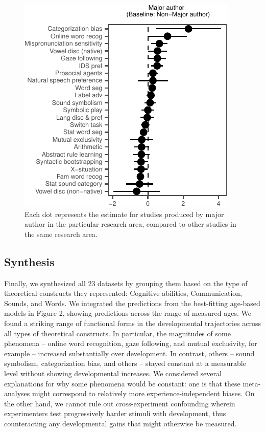 \documentclass[10pt, letterpaper]{article}
\newenvironment{CodeChunk}{}{}
\begin{document}
\begin{CodeChunk}
\begin{figure}[H]

{\centering \includegraphics{figs/image-1} 

}

\caption[Each dot represents the estimate for studies produced by major author in the particular research area, compared to other studies in the same research area]{Each dot represents the estimate for studies produced by major author in the particular research area, compared to other studies in the same research area.}\label{fig:image}
\end{figure}
\end{CodeChunk}

\hypertarget{synthesis}{%
\subsection{Synthesis}\label{synthesis}}

Finally, we synthesized all 23 datasets by grouping them based on the
type of theoretical constructs they represented: Cognitive abilities,
Communication, Sounds, and Words. We integrated the predictions from the
best-fitting age-based models in Figure 2, showing predictions across
the range of measured ages. We found a striking range of functional
forms in the developmental trajectories across all types of theoretical
constructs. In particular, the magnitudes of some phenomena -- online
word recognition, gaze following, and mutual exclusivity, for example --
increased substantially over development. In contrast, others -- sound
symbolism, categorization bias, and others -- stayed constant at a
measurable level without showing developmental increases. We considered
several explanations for why some phenomena would be constant: one is
that these meta-analyses might correspond to relatively more
experience-independent biases. On the other hand, we cannot rule out
cross-experiment confounding wherein experimenters test progressively
harder stimuli with development, thus counteracting any developmental
gains that might otherwise be measured.
\end{document}
